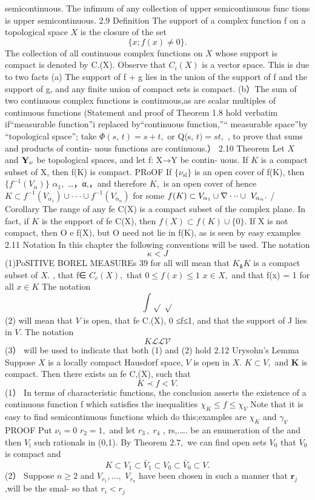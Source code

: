 semicontinuous. The infimum of any collection of upper semicontinuous func tions is upper semicontinuous. 2.9 Definition The support of a complex function f on a topological space $X$ is the closure of the set $$ \{x;f(x)\neq0\}. $$ The collection of all continuous complex functions on $X$ whose support is compact is denoted by C.(X). Observe that $\scriptstyle C_{i}(X)$ is a vector space. This is due to two facts (a) The support of f + g lies in the union of the support of f and the support of g, and any finite union of compact sets is compact. (b）The sum of two continuous complex functions is continuous,as are scalar multiples of continuous functions (Statement and proof of Theorem 1.8 hold verbatim if“measurable function”i replaced by“continuous function,”“ measurable space”by “topological space”; take $\Phi(s,\,t)=s+t,$ or Q(s, $t)=s t,$ , to prove that sums and products of contin- uous functions are continuous.） 2.10 Theorem Let $X$ and ${\bf Y_{\nu}}$ be topological spaces, and let f: X→Y be contin- uous. If $\textstyle K$ is a compact subset of X, then f(K) is compact. PRoOF If $\scriptstyle\{\nu_{\mathrm{sl}}\}$ is an open cover of f(K), then $\{f^{-1}(V_{\alpha})\}$ $\alpha_{1},$ …，α,，and therefore $K,$ is an open cover of hence $K\subset f^{-1}(V_{\alpha_{1}})\cup\cdot\cdot\cdot\cup f^{-1}(V_{\alpha_{n}})$ for some $f(K)\subset V_{\alpha_{1}}\cup\mathbf{\bf\nabla\cdot\cdot\cdot}\cup\ V_{\alpha_{n}}.$ / Corollary The range of any fe C(X) is a compact subset of the complex plane. In fact, if $\textstyle K$ is the support of fe C(X), then $f(X)\subset f(K)\cup\{0\}.$ If X is not compact, then O e f(X), but O need not lie in f(K), as is seen by easy examples 2.11 Notation In this chapter the following conventions will be used. The notation $$ \kappa{\mathrel{<J}} $$ (1)PoSITIVE BOREL MEASUREs 39 for all will mean that $K_{\mathbf{\delta}}K$ is a compact subset of $X.$ , that f∈ $C_{c}(X),$ that $0\leq f(x)\leq1$ $x\in X,$ and that f(x) = 1 for all $x\in K$ The notation $$ \scriptstyle{\int_{}{\sqrt{}}\;\mathbf{\sqrt{}}} $$ (2) will mean that ${\mathbf{}}V$ is open, that fe C.(X), 0 ≤f≤1, and that the support of J lies in $V.$ The notation $$ K{\mathcal{L}}{\mathcal{L}}{\mathcal{V}} $$ (3） will be used to indicate that both (1) and (2) hold 2.12 Urysohn's Lemma Suppose $X$ is a locally compact Hausdorf space, ${\mathbf{}}V$ is open in $X.$ $K\subset V,$ and ${\boldsymbol{K}}$ is compact. Then there exists an fe C,(X), such that $$ K\prec f<V. $$ (1） In terms of characteristic functions, the conclusion asserts the existence of a continuous function f which satisfies the inequalities $\chi_{K}\leq f\leq\chi_{V}$ Note that it is easy to find semicontinuous functions which do this;examples are $\chi_{K}$ and $\gamma_{V}$ PROOF Put $\scriptstyle\nu_{i}=0$ $r_{2}=1,$ and let $r_{3}\,,\;r_{4}$ , rs,.…. be an enumeration of the and then $V_{\mathrm{i}}$ such rationals in (0,1). By Theorem $2.7,$ we can find open sets $V_{\mathrm{0}}$ that ${\overline{{V}}}_{0}$ is compact and $$ K\subset V_{1}\subset{\bar{V}}_{1}\subset V_{0}\subset{\bar{V}}_{0}\subset V. $$ (2） Suppose $n\geq2$ and $V_{r_{1}},\dots,$ $V_{r_{n}}$ have been chosen in such a manner that ${\boldsymbol{r}}_{j}$ ,will be the smal- so that $r_{i}<r_{j}$ 
